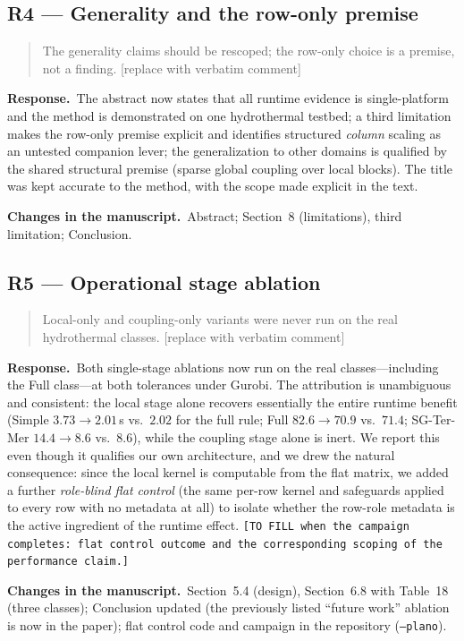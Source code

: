 \documentclass[11pt]{article}
\newenvironment{reviewerquote}%
  {\medskip\noindent\color{quotegray}\itshape\begin{quotation}\noindent}%
  {\end{quotation}\medskip}
\newcommand{\resp}{\noindent\textbf{Response.}\ }
\newcommand{\changes}{\par\smallskip\noindent\textbf{Changes in the manuscript.}\ }
\newcommand{\secref}[1]{Section~#1}
\begin{document}
\subsection*{R4 --- Generality and the row-only premise}
\begin{reviewerquote}
The generality claims should be rescoped; the row-only choice is a premise, not a
finding. [replace with verbatim comment]
\end{reviewerquote}
\resp The abstract now states that all runtime evidence is single-platform and the method
is demonstrated on one hydrothermal testbed; a third limitation makes the row-only
premise explicit and identifies structured \emph{column} scaling as an untested companion
lever; the generalization to other domains is qualified by the shared structural premise
(sparse global coupling over local blocks). The title was kept accurate to the method,
with the scope made explicit in the text.
\changes Abstract; \secref{8} (limitations), third limitation; Conclusion.

\subsection*{R5 --- Operational stage ablation}
\begin{reviewerquote}
Local-only and coupling-only variants were never run on the real hydrothermal classes.
[replace with verbatim comment]
\end{reviewerquote}
\resp Both single-stage ablations now run on the real classes---including the Full
class---at both tolerances under Gurobi. The attribution is unambiguous and consistent:
the local stage alone recovers essentially the entire runtime benefit (Simple
$3.73\to2.01$\,s vs.\ $2.02$ for the full rule; Full $82.6\to70.9$ vs.\ $71.4$;
SG-Ter-Mer $14.4\to8.6$ vs.\ $8.6$), while the coupling stage alone is inert. We report
this even though it qualifies our own architecture, and we drew the natural consequence:
since the local kernel is computable from the flat matrix, we added a further
\emph{role-blind flat control} (the same per-row kernel and safeguards applied to every
row with no metadata at all) to isolate whether the row-role metadata is the active
ingredient of the runtime effect. \texttt{[TO FILL when the campaign completes: flat
control outcome and the corresponding scoping of the performance claim.]}
\changes \secref{5.4} (design), \secref{6.8} with Table~18 (three classes); Conclusion
updated (the previously listed ``future work'' ablation is now in the paper); flat
control code and campaign in the repository (\texttt{--plano}).
\end{document}
